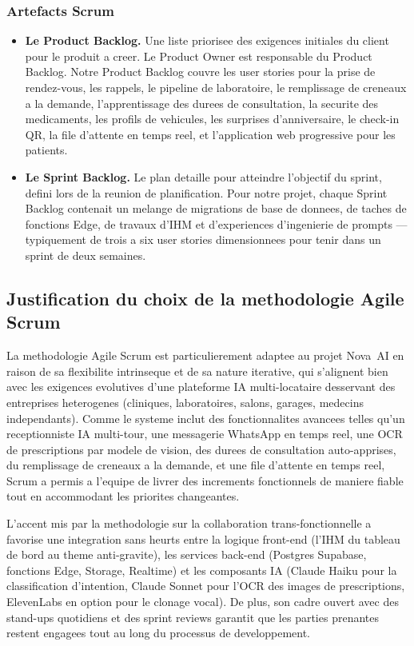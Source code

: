 \subsubsection{Artefacts Scrum}
\begin{itemize}
  \item \textbf{Le Product Backlog.} Une liste priorisee des exigences
        initiales du client pour le produit a creer. Le Product Owner est
        responsable du Product Backlog. Notre Product Backlog couvre les
        user stories pour la prise de rendez-vous, les rappels, le
        pipeline de laboratoire, le remplissage de creneaux a la demande,
        l'apprentissage des durees de consultation, la securite des
        medicaments, les profils de vehicules, les surprises
        d'anniversaire, le check-in QR, la file d'attente en temps reel,
        et l'application web progressive pour les patients.
  \item \textbf{Le Sprint Backlog.} Le plan detaille pour atteindre
        l'objectif du sprint, defini lors de la reunion de planification.
        Pour notre projet, chaque Sprint Backlog contenait un melange de
        migrations de base de donnees, de taches de fonctions Edge, de
        travaux d'IHM et d'experiences d'ingenierie de prompts ---
        typiquement de trois a six user stories dimensionnees pour tenir
        dans un sprint de deux semaines.
\end{itemize}

\subsection{Justification du choix de la methodologie Agile Scrum}
La methodologie Agile Scrum est particulierement adaptee au projet
Nova~AI en raison de sa flexibilite intrinseque et de sa nature
iterative, qui s'alignent bien avec les exigences evolutives d'une
plateforme IA multi-locataire desservant des entreprises heterogenes
(cliniques, laboratoires, salons, garages, medecins independants).
Comme le systeme inclut des fonctionnalites avancees telles qu'un
receptionniste IA multi-tour, une messagerie WhatsApp en temps reel,
une OCR de prescriptions par modele de vision, des durees de
consultation auto-apprises, du remplissage de creneaux a la demande,
et une file d'attente en temps reel, Scrum a permis a l'equipe de
livrer des increments fonctionnels de maniere fiable tout en
accommodant les priorites changeantes.

L'accent mis par la methodologie sur la collaboration trans-fonctionnelle
a favorise une integration sans heurts entre la logique front-end
(l'IHM du tableau de bord au theme anti-gravite), les services back-end
(Postgres Supabase, fonctions Edge, Storage, Realtime) et les composants
IA (Claude Haiku pour la classification d'intention, Claude Sonnet pour
l'OCR des images de prescriptions, ElevenLabs en option pour le clonage
vocal). De plus, son cadre ouvert avec des stand-ups quotidiens et des
sprint reviews garantit que les parties prenantes restent engagees tout
au long du processus de developpement.

